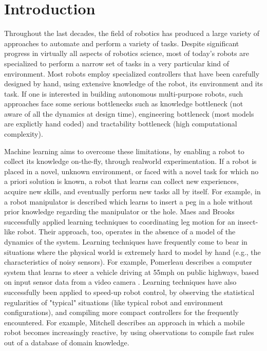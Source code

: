 \documentclass[conference]{IEEEtran}
\begin{document}
\section{Introduction}
Throughout the last decades, the field of robotics has produced a large variety of approaches to automate and perform a variety of tasks. Despite significant progress in virtually all aspects of robotics science, most of today's robots are specialized to perform a narrow set of tasks in a very particular kind of environment. Most robots employ specialized controllers that have been carefully designed by hand, using extensive knowledge of the robot, its environment and its task. If one is interested in building autonomous multi-purpose robots, such approaches face some serious bottlenecks such as knowledge bottleneck (not aware of all the dynamics at design time), engineering bottleneck (most models are explictly hand coded) and tractability bottleneck (high computational complexity). 

Machine learning aims to overcome these limitations, by enabling a robot to collect its knowledge on-the-fly, through realworld experimentation. If a robot is placed in a novel, unknown environment, or faced with a novel task for which no a priori solution is known, a robot that learns can collect new experiences, acquire new skills, and eventually perform new tasks all by itself. For example, in \cite{ref:1} a robot manipulator is described which learns to insert a peg in a hole without prior knowledge regarding the manipulator or the hole. Maes and Brooks \cite{ref:2} successfully applied learning techniques to coordinating leg motion for an insect-like robot. Their approach, too, operates in the absence of a model of the dynamics of the system. Learning techniques have frequently come to bear in situations where the physical world is extremely hard to model by hand (e.g., the characteristics of noisy sensors). For example, Pomerleau describes a computer system that learns to steer a vehicle driving at 55mph on public highways, based on input sensor data from a video camera \cite{ref:3}. Learning techniques have also successfully been applied to speed-up robot control, by observing the statistical regularities of "typical" situations (like typical robot and environment configurations), and compiling more compact controllers for the frequently encountered. For example, Mitchell \cite{ref:4} describes an approach in which a mobile robot becomes increasingly reactive, by using observations to compile fast rules out of a database of domain knowledge. 
\end{document}
